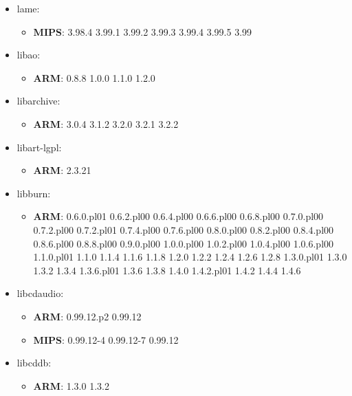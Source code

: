 \documentclass[twocolumn,a4paper]{IEEEtran} %
\begin{document}
\begin{itemize}[noitemsep,topsep=0pt,parsep=0pt,partopsep=0pt]
\item lame:
\begin{itemize}[noitemsep,topsep=0pt,parsep=0pt,partopsep=0pt]
  \item \textbf{MIPS}: 3.98.4 3.99.1 3.99.2 3.99.3 3.99.4 3.99.5 3.99
\end{itemize}

\item libao:
\begin{itemize}[noitemsep,topsep=0pt,parsep=0pt,partopsep=0pt]
  \item \textbf{ARM}: 0.8.8 1.0.0 1.1.0 1.2.0
\end{itemize}

\item libarchive:
\begin{itemize}[noitemsep,topsep=0pt,parsep=0pt,partopsep=0pt]
  \item \textbf{ARM}: 3.0.4 3.1.2 3.2.0 3.2.1 3.2.2
\end{itemize}

\item libart-lgpl:
\begin{itemize}[noitemsep,topsep=0pt,parsep=0pt,partopsep=0pt]
  \item \textbf{ARM}: 2.3.21
\end{itemize}

\item libburn:
\begin{itemize}[noitemsep,topsep=0pt,parsep=0pt,partopsep=0pt]
  \item \textbf{ARM}: 0.6.0.pl01 0.6.2.pl00 0.6.4.pl00 0.6.6.pl00 0.6.8.pl00 0.7.0.pl00 0.7.2.pl00 0.7.2.pl01 0.7.4.pl00 0.7.6.pl00 0.8.0.pl00 0.8.2.pl00 0.8.4.pl00 0.8.6.pl00 0.8.8.pl00 0.9.0.pl00 1.0.0.pl00 1.0.2.pl00 1.0.4.pl00 1.0.6.pl00 1.1.0.pl01 1.1.0 1.1.4 1.1.6 1.1.8 1.2.0 1.2.2 1.2.4 1.2.6 1.2.8 1.3.0.pl01 1.3.0 1.3.2 1.3.4 1.3.6.pl01 1.3.6 1.3.8 1.4.0 1.4.2.pl01 1.4.2 1.4.4 1.4.6
\end{itemize}

\item libcdaudio:
\begin{itemize}[noitemsep,topsep=0pt,parsep=0pt,partopsep=0pt]
  \item \textbf{ARM}: 0.99.12.p2 0.99.12
  \item \textbf{MIPS}: 0.99.12-4 0.99.12-7 0.99.12
\end{itemize}

\item libcddb:
\begin{itemize}[noitemsep,topsep=0pt,parsep=0pt,partopsep=0pt]
  \item \textbf{ARM}: 1.3.0 1.3.2
\end{itemize}


\end{itemize}
\end{document}
